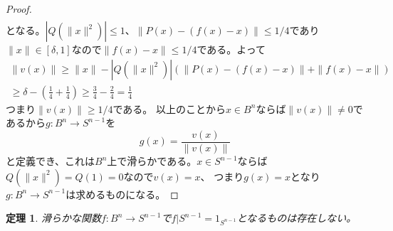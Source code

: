 \documentclass[leqno]{jsarticle}
\newtheorem{thm}{定理}
\begin{document}
\begin{proof}
\begin{align*}
\end{align*}
となる。$|Q(\|x\|^2)|\le 1$、$\|P(x)-(f(x)-x)\|\le 1/4$であり$\|x\|\in[\delta,1]$なので$\|f(x)-x\|\le 1/4$である。よって
\begin{align*}
\|v(x)\|\ge \|x\|-|Q(\|x\|^2)|(\|P(x)-(f(x)-x)\|+\|f(x)-x\|)\\
\ge \delta-(\frac{1}{4}+\frac{1}{4})\ge \frac{3}{4}-\frac{2}{4}=\frac{1}{4}
\end{align*}
つまり$\|v(x)\|\ge 1/4$である。
以上のことから$x\in B^n$ならば$\|v(x)\|\neq0$であるから$g:B^n\to S^{n-1}$を
\[
g(x)=\frac{v(x)}{\|v(x)\|}
\]
と定義でき、これは$B^n$上で滑らかである。$x\in S^{n-1}$ならば$Q(\|x\|^2)=Q(1)=0$なので$v(x)=x$、
つまり$g(x)=x$となり$g:B^n\to S^{n-1}$は求めるものになる。
\end{proof}

\begin{thm}
滑らかな関数$f:B^n\to S^{n-1}$で$f|S^{n-1}=1_{S^{n-1}}$となるものは存在しない。
\end{thm}
\end{document}
